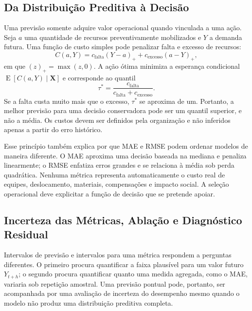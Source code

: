\subsection{Da Distribuição Preditiva à Decisão}

Uma previsão somente adquire valor operacional quando vinculada a uma ação. Seja $a$ uma quantidade de recursos preventivamente mobilizados e $Y$ a demanda futura. Uma função de custo simples pode penalizar falta e excesso de recursos:
\begin{equation}
    C(a,Y)=c_{\mathrm{falta}}(Y-a)_{+}
    +c_{\mathrm{excesso}}(a-Y)_{+},
    \label{eq:custo_assimetrico}
\end{equation}
em que $(z)_{+}=\max(z,0)$. A ação ótima minimiza a esperança condicional $\operatorname{E}[C(a,Y)\mid\mathbf{X}]$ e corresponde ao quantil
\begin{equation}
    \tau^{\ast}
    =\frac{c_{\mathrm{falta}}}
    {c_{\mathrm{falta}}+c_{\mathrm{excesso}}}.
    \label{eq:quantil_decisao}
\end{equation}
Se a falta custa muito mais que o excesso, $\tau^{\ast}$ se aproxima de um. Portanto, a melhor previsão para uma decisão conservadora pode ser um quantil superior, e não a média. Os custos devem ser definidos pela organização e não inferidos apenas a partir do erro histórico.

Esse princípio também explica por que MAE e RMSE podem ordenar modelos de maneira diferente. O MAE aproxima uma decisão baseada na mediana e penaliza linearmente; o RMSE enfatiza erros grandes e se relaciona à média sob perda quadrática. Nenhuma métrica representa automaticamente o custo real de equipes, deslocamento, materiais, compensações e impacto social. A seleção operacional deve explicitar a função de decisão que se pretende apoiar.

\subsection{Incerteza das Métricas, Ablação e Diagnóstico Residual}\label{sec:fund_robustez_metricas}

Intervalos de previsão e intervalos para uma métrica respondem a perguntas diferentes. O primeiro procura quantificar a faixa plausível para um valor futuro $Y_{t+h}$; o segundo procura quantificar quanto uma medida agregada, como o MAE, variaria sob repetição amostral. Uma previsão pontual pode, portanto, ser acompanhada por uma avaliação de incerteza do desempenho mesmo quando o modelo não produz uma distribuição preditiva completa.

